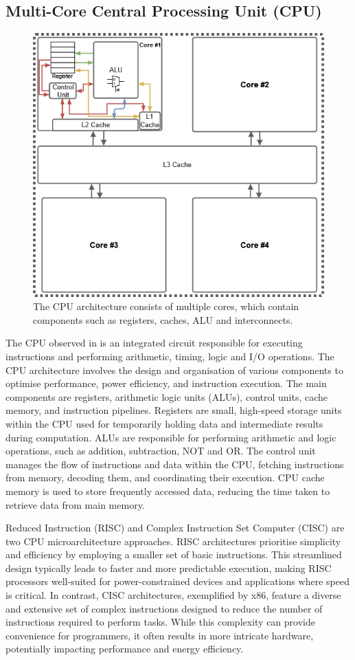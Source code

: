 \subsection{Multi-Core Central Processing Unit (CPU)}
\begin{figure}[H]
\centering
\includegraphics[width=0.7\linewidth]{Images/CPU.png}
\caption[Multi-Core CPU Architecture]{The CPU architecture consists of multiple cores, which contain components such as registers, caches, ALU and interconnects.}
\label{fig:CPU}
\end{figure} 
The CPU observed in  is an integrated circuit responsible for executing instructions and performing arithmetic, timing, logic and I/O operations. The CPU architecture involves the design and organisation of various components to optimise performance, power efficiency, and instruction execution. The main components are registers, arithmetic logic units (ALUs), control units, cache memory, and instruction pipelines. Registers are small, high-speed storage units within the CPU used for temporarily holding data and intermediate results during computation. ALUs are responsible for performing arithmetic and logic operations, such as addition, subtraction, NOT and OR. The control unit manages the flow of instructions and data within the CPU, fetching instructions from memory, decoding them, and coordinating their execution. CPU cache memory is used to store frequently accessed data, reducing the time taken to retrieve data from main memory.

Reduced Instruction (RISC) and Complex Instruction Set Computer (CISC) are two CPU microarchitecture approaches. RISC architectures prioritise simplicity and efficiency by employing a smaller set of basic instructions. This streamlined design typically leads to faster and more predictable execution, making RISC processors well-suited for power-constrained devices and applications where speed is critical. In contrast, CISC architectures, exemplified by x86, feature a diverse and extensive set of complex instructions designed to reduce the number of instructions required to perform tasks. While this complexity can provide convenience for programmers, it often results in more intricate hardware, potentially impacting performance and energy efficiency. 


